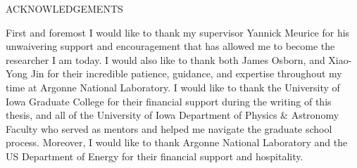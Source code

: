 \begin{doublespace}
\begin{tightcenter}
ACKNOWLEDGEMENTS
\mylinespacing%
\end{tightcenter}
First and foremost I would like to thank my supervisor Yannick Meurice for his unwaivering support and encouragement
that has allowed me to become the researcher I am today.
%
I would also like to thank both James Osborn, and Xiao-Yong Jin for their incredible patience, guidance, and expertise
throughout my time at Argonne National Laboratory.
%
I would like to thank the University of Iowa Graduate College for their financial support during the writing
of this thesis, and all of the University of Iowa Department of Physics \& Astronomy Faculty who served as mentors and
helped me navigate the graduate school process.
%
Moreover, I would like to thank Argonne National Laboratory and the US Department of Energy for their financial support
and hospitality.



\mylinespacing
\begin{tightcenter}
\myoptpg
\end{tightcenter}
\end{doublespace}
